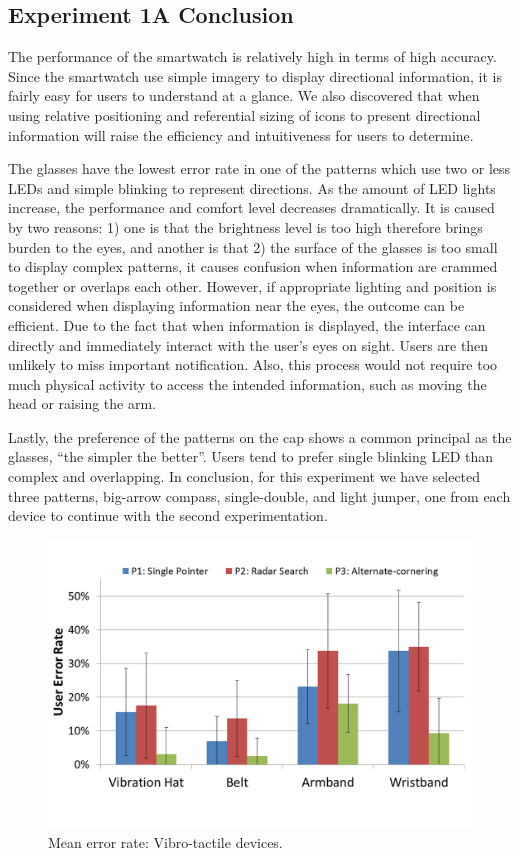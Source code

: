 \documentclass{sigchi}
\begin{document}
\subsection{Experiment 1A Conclusion}
The performance of the smartwatch is relatively high in terms of high accuracy. Since the smartwatch use simple imagery to display directional information, it is fairly easy for users to understand at a glance. We also discovered that when using relative positioning and referential sizing of icons to present directional information will raise the efficiency and intuitiveness for users to determine.

The glasses have the lowest error rate in one of the patterns which use two or less LEDs and simple blinking to represent directions. As the amount of LED lights increase, the performance and comfort level decreases dramatically. It is caused by two reasons: 1) one is that the brightness level is too high therefore brings burden to the eyes, and another is that 2) the surface of the glasses is too small to display complex patterns, it causes confusion when information are crammed together or overlaps each other. However, if appropriate lighting and position is considered when displaying information near the eyes, the outcome can be efficient. Due to the fact that when information is displayed, the interface can directly and immediately interact with the user's eyes on sight. Users are then unlikely to miss important notification. Also, this process would not require too much physical activity to access the intended information, such as moving the head or raising the arm.

Lastly, the preference of the patterns on the cap shows a common principal as the glasses, \textquotedblleft the simpler the better\textquotedblright. Users tend to prefer single blinking LED than complex and overlapping. In conclusion, for this experiment we have selected three patterns, big-arrow compass, single-double, and light jumper, one from each device to continue with the second experimentation.

\begin{figure}[!t]
\centering
\includegraphics[width=\columnwidth]{Vibro_ER}
\caption{Mean error rate: Vibro-tactile devices.}
\label{fig:Vibro_ER}
\end{figure}
\end{document}
